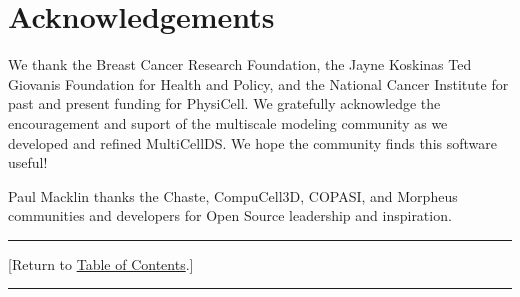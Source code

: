 \documentclass[12pt]{article}
\renewcommand{\v}{\verb}
\newcommand{\red}[1]{\textcolor{red}{#1}}
\newcommand{\FIX}{}%
\newcommand{\TOClink}{\begin{center}\hrule\vskip-10pt\phantom{.}\hfill[Return to \hyperlink{TOC}{Table of Contents}.]\hfill\phantom{.}\vskip3pt\hrule\end{center}}
\begin{document}










\section{Acknowledgements}
We thank the Breast Cancer Research Foundation, the 
Jayne Koskinas Ted Giovanis Foundation for Health and Policy, and 
the National Cancer Institute for past and present funding for 
PhysiCell. We gratefully acknowledge the encouragement and 
suport of the multiscale modeling community as we 
developed and refined MultiCellDS. We hope the community 
finds this software useful! 

Paul Macklin thanks the Chaste, CompuCell3D, COPASI, and Morpheus communities and 
developers for Open Source leadership and inspiration. 
\TOClink



\end{document}
